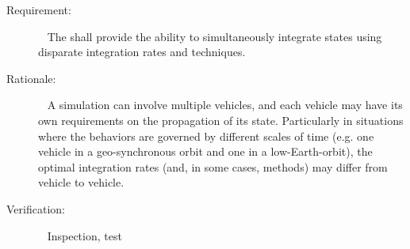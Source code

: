 \label{reqt:multiple_integrators}
\begin{description}
\item[Requirement:]\ \newline
 The \ModelDesc shall provide the ability to simultaneously integrate states
 using disparate integration rates and techniques.

\item[Rationale:]\ \newline
 A simulation can involve multiple vehicles, and each vehicle may have its
 own requirements on the propagation of its state.  Particularly in
 situations where the behaviors are governed by different scales of time
 (e.g. one vehicle in a geo-synchronous orbit and one in a low-Earth-orbit),
 the optimal integration rates (and, in some cases, methods) may differ from
 vehicle to vehicle.

\item[Verification:]\ \newline
 Inspection, test
\end{description}
